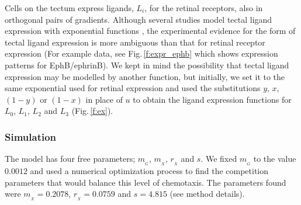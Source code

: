 \documentclass[9pt,lineno,draft]{elife}
\begin{document}
%

Cells on the tectum express ligands, $L_i$, for the retinal receptors, also in orthogonal pairs of gradients.
Although several studies model tectal ligand expression with exponential functions \citep{koulakov_stochastic_2004}, the experimental evidence for the form of tectal ligand expression is more ambiguous than that for retinal receptor expression (For example data, see Fig.\,\ref{f:expr_ephb} which shows expression patterns for EphB/ephrinB).
We kept in mind the possibility that tectal ligand expression may be modelled by another function, but initially, we set it to the same exponential used for retinal expression and used the substitutions $y$, $x$, $(1-y)$ or $(1-x)$ in place of $u$ to obtain the ligand expression functions for $L_0$, $L_1$, $L_2$ and $L_3$ (Fig.\,\ref{f:ex}).


\subsubsection*{Simulation}

The model has four free parameters; $m_{\!_G}$, $m_{\!_X}$, $r_{\!_X}$ and $s$. We fixed $m_{\!_G}$ to the value $0.0012$ and used a numerical optimization process to find the competition parameters that would balance this level of chemotaxis. The parameters found were $m_{\!_X} = 0.2078$, $r_{\!_X} = 0.0759$ and $s = 4.815$ (see method details).
\end{document}
